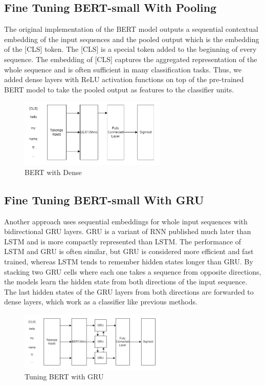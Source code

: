 \documentclass[conference]{IEEEtran}
\begin{document}
\subsection{Fine Tuning BERT-small With Pooling} 
The original implementation of the BERT model outputs a sequential contextual embedding of the input sequences and the pooled output which is the embedding of the [CLS] token\cite{DBLP:journals/corr/abs-1810-04805}. The [CLS] is a special token added to the beginning of every sequence. The embedding of [CLS] captures the aggregated representation of the whole sequence and is often sufficient in many classification tasks. Thus, we added dense layers with ReLU activation functions on top of the pre-trained BERT model to take the pooled output as features to the classifier units.

\begin{figure}[htbp]
\centerline{\includegraphics[width=7cm, keepaspectratio,]{fig/bert-pool.png}}
\caption{BERT with Dense}
\label{fig}
\end{figure}

\subsection{Fine Tuning BERT-small With GRU}
Another approach uses sequential embeddings for whole input sequences with bidirectional GRU layers\cite{DBLP:journals/corr/ChoMBB14}. GRU is a variant of RNN published much later than LSTM and is more compactly represented than LSTM\cite{https://www.researchgate.net/publication/13853244_Long_Short-term_Memory}. The performance of LSTM and GRU is often similar, but GRU is considered more efficient and fast trained, whereas LSTM tends to remember hidden states longer than GRU. By stacking two GRU cells where each one takes a sequence from opposite directions, the models learn the hidden state from both directions of the input sequence. The last hidden states of the GRU layers from both directions are forwarded to dense layers, which work as a classifier like previous methods.

\begin{figure}[htbp]
\centerline{\includegraphics[width=7cm, keepaspectratio,]{fig/bert-gru.png}}
\caption{Tuning BERT with GRU}
\label{fig}
\end{figure}
\end{document}
